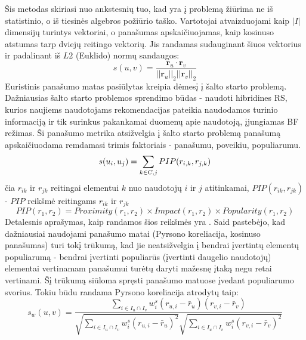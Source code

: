\documentclass{VUMIFInfMagistrinis}
\begin{document}
Šis metodas skiriasi nuo ankstesnių tuo, kad yra į problemą žiūrima ne iš statistinio, o iš tiesinės algebros požiūrio taško. Vartotojai atvaizduojami kaip $|I|$ dimensijų turintys vektoriai, o panašumas apskaičiuojamas, kaip kosinuso atstumas tarp dviejų reitingo vektorių. Jis randamas sudauginant šiuos vektorius ir padalinant iš $L2$ (Euklido) normų sandaugos:
\begin{equation}
s(u,v) = \frac{\boldsymbol{r}_u \cdot \boldsymbol{r}_v}{||\boldsymbol{r}_u||_2 ||\boldsymbol{r}_v||_2}
\end{equation}
Euristinis panašumo matas pasiūlytas \cite{7} kreipia dėmesį į šalto starto problemą. Dažniausias šalto starto problemos sprendimo būdas - naudoti hibridines RS, kurios naujiems naudotojams rekomendacijas pateikia naudodamos turinio informaciją ir tik surinkus pakankamai duomenų apie naudotoją, įjungiamas BF režimas. Ši panašumo metrika atsižvelgia į šalto starto problemą panašumą apskaičiuodama remdamasi trimis faktoriais - panašumu, poveikiu, populiarumu.
\begin{equation}
s(u_i, u_j)= \sum \limits_{k \in C, j}\boldmath{PIP}(r_{i,k}, r_{j,k})
\end{equation}
čia $r_{ik}$ ir $r_{jk}$ reitingai elementui $k$ nuo naudotojų $i$ ir $j$ atitinkamai, $PIP(r_{ik}, r_{jk})$ - $PIP$ reikšmė reitingams $r_{ik}$ ir $r_{jk}$
\begin{equation}
PIP(r_1,r_2) = Proximity(r_1,r_2) \times Impact(r_1,r_2) \times Popularity(r_1,r_2)
\end{equation}
Detalesnis aprašymas, kaip randamos šios reikšmės yra \cite{7}.
\cite{13} Said pastebėjo, kad dažniausiai naudojami panašumo matai (Pyrsono koreliacija, kosinuso panašumas) turi tokį trūkumą, kad jie neatsižvelgia į bendrai įvertintų elementų populiarumą - bendrai įvertinti populiarūs (įvertinti daugelio naudotojų) elementai vertinamam panašumui turėtų daryti mažesnę įtaką negu retai vertinami. Šį trūkumą siūloma spręsti panašumo matuose įvedant populiarumo svorius.
\newline
\indent
Tokiu būdu randama Pyrsono koreliacija atrodytų taip:
\begin{equation}
s_w(u,v) = \frac{\sum \limits_{i\in I_u \cap I_v }w_i^s(r_{u,i}-\bar{r}_u)(r_{v,i}-\bar{r}_v)}{\sqrt{\sum\limits_{i \in I_u \cap I_v }w_i^s(r_{u,i} - \bar{r}_u)^2}\sqrt{\sum\limits_{i \in I_u \cap I_v }w_i^s(r_{v,i} - \bar{r}_v)^2}}
\end{equation}
\end{document}
